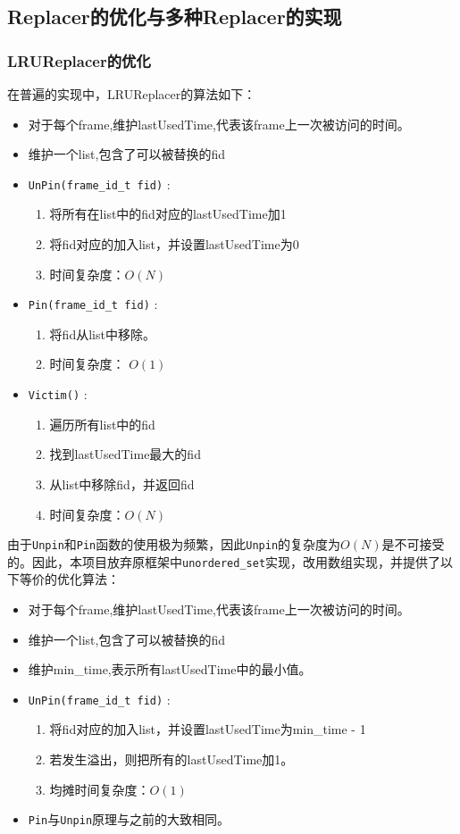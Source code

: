 \documentclass[12pt, a4paper]{article}
\def\c#1{\texttt{#1}}
\def\ss#1{\subsection{#1}}
\def\sss#1{\subsubsection{#1}}
\def\fid{frame\_id\_t\ }
\def\p{\par}
\begin{document}
\ss{Replacer的优化与多种Replacer的实现}
\sss{LRUReplacer的优化}
在普遍的实现中，LRUReplacer的算法如下：
\begin{itemize}
  \item 对于每个frame,维护lastUsedTime,代表该frame上一次被访问的时间。
  \item 维护一个list,包含了可以被替换的fid
  \item \c{UnPin(\fid fid)} :\begin{enumerate}
    \item 将所有在list中的fid对应的lastUsedTime加1
    \item 将fid对应的加入list，并设置lastUsedTime为0
    \item 时间复杂度：$O(N)$
  \end{enumerate} 
  \item \c{Pin(\fid fid)} : \begin{enumerate}
    \item 将fid从list中移除。
    \item 时间复杂度： $O(1)$
  \end{enumerate}
  \item \c{Victim()} : \begin{enumerate}
    \item 遍历所有list中的fid
    \item 找到lastUsedTime最大的fid
    \item 从list中移除fid，并返回fid
    \item 时间复杂度：$O(N)$
  \end{enumerate}
\end{itemize}
\p 由于\c{Unpin}和\c{Pin}函数的使用极为频繁，因此\c{Unpin}的复杂度为$O(N)$是不可接受的。因此，本项目放弃原框架中\c{unordered\_set}实现，改用数组实现，并提供了以下等价的优化算法：
\begin{itemize}
  \item 对于每个frame,维护lastUsedTime,代表该frame上一次被访问的时间。
  \item 维护一个list,包含了可以被替换的fid 
  \item 维护min\_time,表示所有lastUsedTime中的最小值。
  \item \c{UnPin(\fid fid)} :\begin{enumerate}
    \item 将fid对应的加入list，并设置lastUsedTime为min\_time - 1
    \item 若发生溢出，则把所有的lastUsedTime加1。
    \item 均摊时间复杂度：$O(1)$
  \end{enumerate} 
  \item \c{Pin}与\c{Unpin}原理与之前的大致相同。
\end{itemize}
\end{document}
